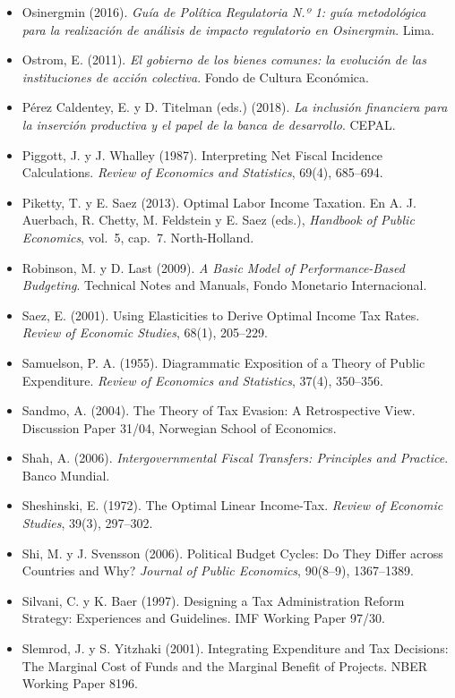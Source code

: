 \documentclass[11pt,a4paper]{article}
\begin{document}
{\begin{itemize}[leftmargin=1.4em,itemsep=1pt,label={}]
\item Osinergmin (2016). \emph{Guía de Política Regulatoria N.º 1: guía metodológica para la realización de análisis de impacto regulatorio en Osinergmin}. Lima.
\item Ostrom, E. (2011). \emph{El gobierno de los bienes comunes: la evolución de las instituciones de acción colectiva}. Fondo de Cultura Económica.
\item Pérez Caldentey, E. y D. Titelman (eds.) (2018). \emph{La inclusión financiera para la inserción productiva y el papel de la banca de desarrollo}. CEPAL.
\item Piggott, J. y J. Whalley (1987). Interpreting Net Fiscal Incidence Calculations. \emph{Review of Economics and Statistics}, 69(4), 685--694.
\item Piketty, T. y E. Saez (2013). Optimal Labor Income Taxation. En A. J. Auerbach, R. Chetty, M. Feldstein y E. Saez (eds.), \emph{Handbook of Public Economics}, vol.~5, cap.~7. North-Holland.
\item Robinson, M. y D. Last (2009). \emph{A Basic Model of Performance-Based Budgeting}. Technical Notes and Manuals, Fondo Monetario Internacional.
\item Saez, E. (2001). Using Elasticities to Derive Optimal Income Tax Rates. \emph{Review of Economic Studies}, 68(1), 205--229.
\item Samuelson, P. A. (1955). Diagrammatic Exposition of a Theory of Public Expenditure. \emph{Review of Economics and Statistics}, 37(4), 350--356.
\item Sandmo, A. (2004). The Theory of Tax Evasion: A Retrospective View. Discussion Paper 31/04, Norwegian School of Economics.
\item Shah, A. (2006). \emph{Intergovernmental Fiscal Transfers: Principles and Practice}. Banco Mundial.
\item Sheshinski, E. (1972). The Optimal Linear Income-Tax. \emph{Review of Economic Studies}, 39(3), 297--302.
\item Shi, M. y J. Svensson (2006). Political Budget Cycles: Do They Differ across Countries and Why? \emph{Journal of Public Economics}, 90(8--9), 1367--1389.
\item Silvani, C. y K. Baer (1997). Designing a Tax Administration Reform Strategy: Experiences and Guidelines. IMF Working Paper 97/30.
\item Slemrod, J. y S. Yitzhaki (2001). Integrating Expenditure and Tax Decisions: The Marginal Cost of Funds and the Marginal Benefit of Projects. NBER Working Paper 8196.

\end{itemize}}
\end{document}
